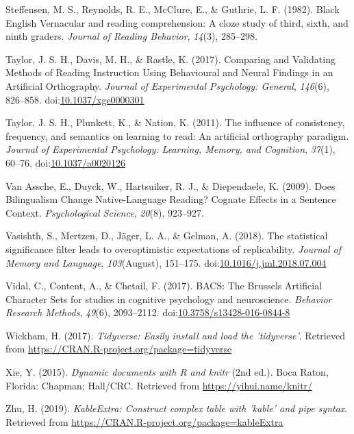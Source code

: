 \documentclass[doc,floatsintext]{apa6}
\begin{document}
\hypertarget{ref-Steffensen1982}{}
Steffensen, M. S., Reynolds, R. E., McClure, E., \& Guthrie, L. F.
(1982). Black English Vernacular and reading comprehension: A cloze
study of third, sixth, and ninth graders. \emph{Journal of Reading
Behavior}, \emph{14}(3), 285--298.

\hypertarget{ref-Taylor2017}{}
Taylor, J. S. H., Davis, M. H., \& Rastle, K. (2017). Comparing and
Validating Methods of Reading Instruction Using Behavioural and Neural
Findings in an Artificial Orthography. \emph{Journal of Experimental
Psychology: General}, \emph{146}(6), 826--858.
doi:\href{https://doi.org/10.1037/xge0000301}{10.1037/xge0000301}

\hypertarget{ref-Taylor2011}{}
Taylor, J. S. H., Plunkett, K., \& Nation, K. (2011). The influence of
consistency, frequency, and semantics on learning to read: An artificial
orthography paradigm. \emph{Journal of Experimental Psychology:
Learning, Memory, and Cognition}, \emph{37}(1), 60--76.
doi:\href{https://doi.org/10.1037/a0020126}{10.1037/a0020126}

\hypertarget{ref-VanAssche2009}{}
Van Assche, E., Duyck, W., Hartsuiker, R. J., \& Diependaele, K. (2009).
Does Bilingualism Change Native-Language Reading? Cognate Effects in a
Sentence Context. \emph{Psychological Science}, \emph{20}(8), 923--927.

\hypertarget{ref-Vasishth2018}{}
Vasishth, S., Mertzen, D., Jäger, L. A., \& Gelman, A. (2018). The
statistical significance filter leads to overoptimistic expectations of
replicability. \emph{Journal of Memory and Language},
\emph{103}(August), 151--175.
doi:\href{https://doi.org/10.1016/j.jml.2018.07.004}{10.1016/j.jml.2018.07.004}

\hypertarget{ref-Vidal2017}{}
Vidal, C., Content, A., \& Chetail, F. (2017). BACS: The Brussels
Artificial Character Sets for studies in cognitive psychology and
neuroscience. \emph{Behavior Research Methods}, \emph{49}(6),
2093--2112.
doi:\href{https://doi.org/10.3758/s13428-016-0844-8}{10.3758/s13428-016-0844-8}

\hypertarget{ref-R-tidyverse}{}
Wickham, H. (2017). \emph{Tidyverse: Easily install and load the
'tidyverse'}. Retrieved from
\url{https://CRAN.R-project.org/package=tidyverse}

\hypertarget{ref-R-knitr}{}
Xie, Y. (2015). \emph{Dynamic documents with R and knitr} (2nd ed.).
Boca Raton, Florida: Chapman; Hall/CRC. Retrieved from
\url{https://yihui.name/knitr/}

\hypertarget{ref-R-kableExtra}{}
Zhu, H. (2019). \emph{KableExtra: Construct complex table with 'kable'
and pipe syntax}. Retrieved from
\url{https://CRAN.R-project.org/package=kableExtra}
\end{document}
